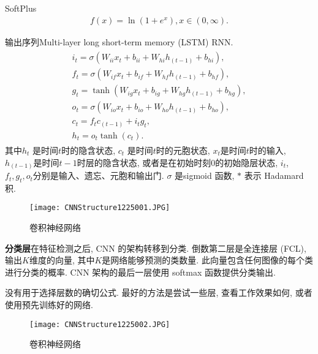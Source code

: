 SoftPlus \cite{glorot2011}
\begin{align}
    f (x)=\ln \left (1+e^{x}\right), x\in (0, \infty).
\end{align}

输出序列Multi-layer long short-term memory (LSTM) RNN.
\begin{align}
\begin{array}{l}
{i_{t}=\sigma\left (W_{i i} x_{t}+b_{i i}+W_{h i} h_{ (t-1)}+b_{h i}\right)}, \\
{f_{t}=\sigma\left (W_{i f} x_{t}+b_{i f}+W_{h f} h_{ (t-1)}+b_{h f}\right)}, \\
{g_{t}=\tanh \left (W_{i g} x_{t}+b_{i g}+W_{h g} h_{ (t-1)}+b_{h g}\right)}, \\
{o_{t}=\sigma\left (W_{i o} x_{t}+b_{i o}+W_{h o} h_{ (t-1)}+b_{h o}\right)}, \\
{c_{t}=f_{t}  c_{ (t-1)}+i_{t}  g_{t}}, \\
{h_{t}=o_{t}  \tanh \left (c_{t}\right)}.
\end{array}
\end{align}
其中$h_t$ 是时间$t$时的隐含状态, $c_t$ 是时间$t$时的元胞状态, $x_t$是时间$t$时的输入, $h_{(t-1)}$是时间$t-1$时层的隐含状态, 或者是在初始时刻0的初始隐层状态,
$i_t$, $f_t, g_t, o_t$分别是输入、遗忘、元胞和输出门. $\sigma$ 是sigmoid 函数, $*$ 表示 Hadamard 积. 
\begin{figure}[H]
\centering
\texttt{[image: CNNStructure1225001.JPG]}
\caption{卷积神经网络}
\label{CNNStructure1225001}
\vspace{-0.4cm}
\end{figure}

\textbf{分类层}在特征检测之后, CNN 的架构转移到分类. 倒数第二层是全连接层 (FCL), 输出$K$维度的向量, 其中$K$是网络能够预测的类数量. 此向量包含任何图像的每个类进行分类的概率. CNN 架构的最后一层使用 softmax 函数提供分类输出.

\begin{remark}
    没有用于选择层数的确切公式. 最好的方法是尝试一些层, 查看工作效果如何, 或者使用预先训练好的网络.
\end{remark}
\begin{figure}[H]
\centering
\texttt{[image: CNNStructure1225002.JPG]}
\caption{卷积神经网络}
\label{CNNStructure1225002}
\vspace{-0.4cm}
\end{figure}

